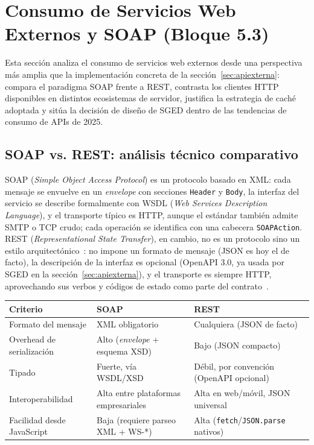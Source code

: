 \documentclass[11pt,a4paper]{article}
\begin{document}
\section{Consumo de Servicios Web Externos y SOAP (Bloque 5.3)}
\label{sec:soap}

Esta sección analiza el consumo de servicios web externos desde una
perspectiva más amplia que la implementación concreta de la
sección~\ref{sec:apiexterna}: compara el paradigma SOAP frente a REST,
contrasta los clientes HTTP disponibles en distintos ecosistemas de
servidor, justifica la estrategia de caché adoptada y sitúa la decisión de
diseño de SGED dentro de las tendencias de consumo de APIs de 2025.

\subsection{SOAP vs. REST: análisis técnico comparativo}

SOAP (\emph{Simple Object Access Protocol}) es un protocolo basado en XML:
cada mensaje se envuelve en un \emph{envelope} con secciones
\texttt{Header} y \texttt{Body}, la interfaz del servicio se describe
formalmente con WSDL (\emph{Web Services Description Language}), y el
transporte típico es HTTP, aunque el estándar también admite SMTP o TCP
crudo; cada operación se identifica con una cabecera \texttt{SOAPAction}.
REST (\emph{Representational State Transfer}), en cambio, no es un
protocolo sino un estilo arquitectónico~\cite{fielding2000}: no impone un
formato de mensaje (JSON es hoy el de facto), la descripción de la interfaz
es opcional (OpenAPI 3.0, ya usada por SGED en la
sección~\ref{sec:apiexterna}), y el transporte es siempre HTTP,
aprovechando sus verbos y códigos de estado como parte del
contrato~\cite{bajrami2024}.

\begin{center}
\begin{tabular}{@{}lll@{}}
\toprule
\textbf{Criterio} & \textbf{SOAP} & \textbf{REST} \\
\midrule
Formato del mensaje & XML obligatorio & Cualquiera (JSON de facto) \\
Overhead de serialización & Alto (\emph{envelope} + esquema XSD) & Bajo (JSON compacto) \\
Tipado & Fuerte, vía WSDL/XSD & Débil, por convención (OpenAPI opcional) \\
Interoperabilidad & Alta entre plataformas empresariales & Alta en web/móvil, JSON universal \\
Facilidad desde JavaScript & Baja (requiere parseo XML + WS-*) & Alta (\texttt{fetch}/\texttt{JSON.parse} nativos) \\
\bottomrule
\end{tabular}
\end{center}
\end{document}
